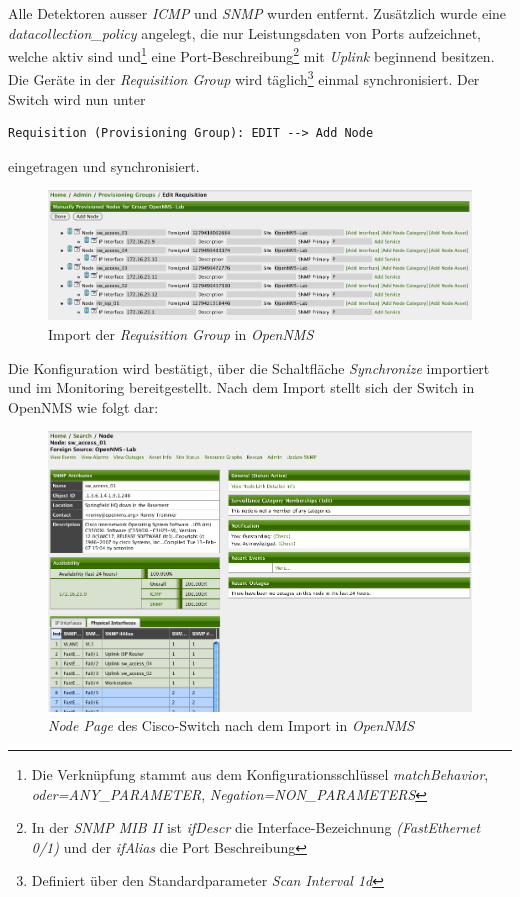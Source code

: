 Alle Detektoren ausser \emph{ICMP} und \emph{SNMP} wurden entfernt. Zusätzlich wurde eine \emph{datacollection\_policy} angelegt, die nur Leistungsdaten von Ports aufzeichnet, welche aktiv sind und\footnote{Die Verknüpfung stammt aus dem Konfigurationsschlüssel \emph{matchBehavior}, \emph{oder=ANY\_PARAMETER}, \emph{Negation=NON\_PARAMETERS}} eine Port-Beschreibung\footnote{In der \emph{SNMP MIB II} ist \emph{ifDescr} die Interface-Bezeichnung \emph{(FastEthernet 0/1)} und der \emph{ifAlias} die Port Beschreibung} mit \emph{Uplink} beginnend besitzen. Die Geräte in der \emph{Requisition Group} wird täglich\footnote{Definiert über den Standardparameter \emph{Scan Interval 1d}} einmal synchronisiert. Der Switch wird nun unter 

\begin{lstlisting}[numbers=none]
Requisition (Provisioning Group): EDIT --> Add Node
\end{lstlisting}

eingetragen und synchronisiert.

\begin{figure}[H]
	\centering
	\includegraphics[width=1.0\textwidth]{images/use-cases/monitoring-layer-2/requisition-import}
	\caption{Import der \emph{Requisition Group} in \emph{OpenNMS}}
	\label{pic:requisition-import}
\end{figure}

Die Konfiguration wird bestätigt, über die Schaltfläche \emph{Synchronize} importiert und im Monitoring bereitgestellt. Nach dem Import stellt sich der Switch in OpenNMS wie folgt dar:

\begin{figure}[H]
	\centering
	\includegraphics[width=1.0\textwidth]{images/use-cases/monitoring-layer-2/node-page}
	\caption{\emph{Node Page} des Cisco-Switch nach dem Import in \emph{OpenNMS}}
	\label{pic:node-page}
\end{figure}

